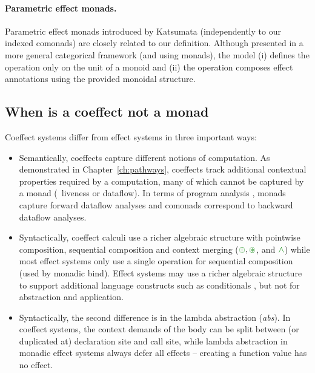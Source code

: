 \paragraph{Parametric effect monads.}
Parametric effect monads introduced by Katsumata \cite{monads-parametric} (independently to our
indexed comonads) are closely related to our definition.  Although presented in a more general
categorical framework (and using monads), the model (i) defines the  operation only on the
unit of a monoid and (ii) the  operation composes effect annotations using the provided
monoidal structure.

\subsection{When is a coeffect not a monad}
\label{sec:semantics-related-monad}

Coeffect systems differ from effect systems in three important ways:

\begin{itemize}
\item Semantically, coeffects capture different notions of computation. As demonstrated in
  Chapter~\ref{ch:pathways}, coeffects track additional contextual properties required by a
  computation, many of which cannot be captured by a monad (\eg~liveness or dataflow).
  In terms of program analysis \cite{other-optcomp}, monads capture forward dataflow analyses and
  comonads correspond to backward dataflow analyses.

\item Syntactically, coeffect calculi use a richer algebraic structure with pointwise composition,
  sequential composition and context merging ($\cpar, \cseq$, and $\czip$) while most effect systems
  only use a single operation for sequential composition (used by monadic bind). Effect systems
  may use a richer algebraic structure to support additional language constructs such as conditionals
  \cite{effects-nielson,effects-revisited}, but not for abstraction and application.

\item Syntactically, the second difference is in the lambda abstraction (\emph{abs}). In
  coeffect systems, the context demands of the body can be split between (or duplicated
  at) declaration site and call site, while lambda abstraction in monadic effect systems always
  defer all effects -- creating a function value has no effect.
\end{itemize}

